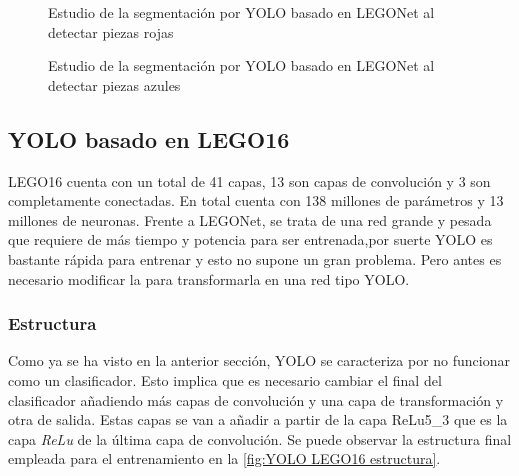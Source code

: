 \begin{figure}[ht]  %
  \hfill	
\caption{Estudio de la segmentación por YOLO basado en LEGONet al detectar piezas rojas}
\label{fig:red YOLO LEGONet}
\vspace{-5pt}
\end{figure}

\begin{figure}[ht]  %
  \hfill	
\caption{Estudio de la segmentación por YOLO basado en LEGONet al detectar piezas azules}
\label{fig:blue YOLO LEGONet}
\vspace{-5pt}
\end{figure}

\newpage
\subsection{YOLO basado en LEGO16}
LEGO16 cuenta con un total de 41 capas, 13 son capas de convolución y 3 son completamente conectadas. En total cuenta con 138 millones de parámetros y 13 millones de neuronas. Frente a LEGONet, se trata de una red grande y pesada que requiere de más tiempo y potencia para ser entrenada,por suerte YOLO es bastante rápida para entrenar y esto no supone un gran problema. Pero antes es necesario modificar la para transformarla en una red tipo YOLO.

\subsubsection*{Estructura}
Como ya se ha visto en la anterior sección, YOLO se caracteriza por no funcionar como un clasificador. Esto implica que es necesario cambiar el final del clasificador añadiendo más capas de convolución y una capa de transformación y otra de salida. Estas capas se van a añadir a partir de la capa ReLu5\_3 que es la capa \textit{ReLu} de la última capa de convolución. Se puede observar la estructura final empleada para el entrenamiento en la \autoref{fig:YOLO LEGO16 estructura}.

